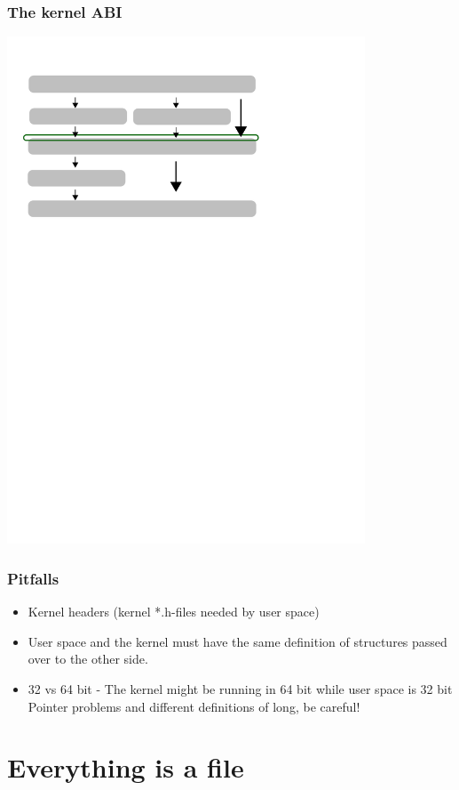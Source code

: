 \documentclass{beamer}
\begin{document}
\begin{frame}
\frametitle{The kernel ABI}
\begin{center}
	\includegraphics[width=0.8\textwidth]{kernel}
\end{center}
\end{frame}

\begin{frame}
\frametitle{Pitfalls}
\begin{itemize}
	\item Kernel headers (kernel *.h-files needed by user space)
	\item User space and the kernel must have the same definition of structures passed over to the other side.
	\item 32 vs 64 bit - The kernel might be running in 64 bit while user space is 32 bit
Pointer problems and different definitions of long, be careful!
\end{itemize}
\end{frame}

\section{Everything is a file}
\end{document}
